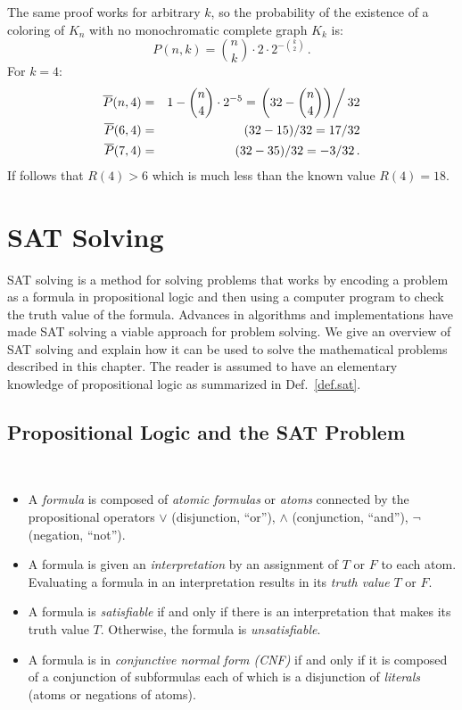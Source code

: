 The same proof works for arbitrary $k$, so the probability of the existence of a coloring of $K_n$ with no monochromatic complete graph $K_k$ is:
\[
P(n,k)=\binom{n}{k}\cdot 2\cdot 2^{-\binom{k}{2}}\,.
\]
For $k=4$:
\begin{eqnarray*}
\overline{P}(n,4)&=&1-\binom{n}{4}\cdot 2^{-5}=\left.\left(32-\binom{n}{4}\right)\right/32\\
\overline{P}(6,4)&=&(32-15)/32=17/32\\
\overline{P}(7,4)&=&(32-35)/32=-3/32\,.
\end{eqnarray*}
If follows that $R(4)>6$ which is much less than the known value $R(4)=18$.



\section{SAT Solving}\label{s.sat}

SAT solving is a method for solving problems that works by encoding a problem as a formula in propositional logic and then using a computer program to check the truth value of the formula. Advances in algorithms and implementations have made SAT solving a viable approach for problem solving. We give an overview of SAT solving and explain how it can be used to solve the mathematical problems described in this chapter. The reader is assumed to have an elementary knowledge of propositional logic as summarized in Def.~\ref{def.sat}.

\subsection{Propositional Logic and the SAT Problem}

\begin{definition}\label{def.sat}\mbox{}\\
\begin{itemize}
\item A \emph{formula} is composed of \emph{atomic formulas} or \emph{atoms} connected by the propositional operators $\vee$ (disjunction, ``or''), $\wedge$ (conjunction, ``and''), $\neg$ (negation, ``not'').
\item A formula is given an \emph{interpretation} by an assignment of $T$ or $F$ to each atom. Evaluating a formula in an interpretation results in its \emph{truth value} $T$ or $F$. 
\item A formula is \emph{satisfiable} if and only if there is an interpretation that makes its truth value $T$. Otherwise, the formula is \emph{unsatisfiable}.
\item A formula is in \emph{conjunctive normal form (CNF)} if and only if it is composed of a conjunction of subformulas each of which is a disjunction of \emph{literals} (atoms or negations of atoms).
\end{itemize}
\end{definition}

